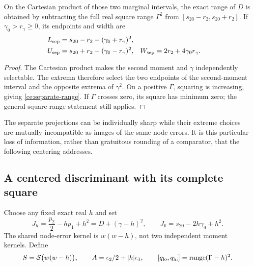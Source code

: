 \begin{proposition}
\label{ce:separate}
On the Cartesian product of those two marginal intervals, the exact
range of $D$ is obtained by subtracting the full real square range
$\Gamma^2$ from $[s_{20}-r_2,s_{20}+r_2]$.
If $\gamma_0>r_\gamma\ge0$, its endpoints and width are
\begin{align}
 L_{\rm sep}&=s_{20}-r_2-(\gamma_0+r_\gamma)^2,\notag\\
 U_{\rm sep}&=s_{20}+r_2-(\gamma_0-r_\gamma)^2,
 &W_{\rm sep}&=2r_2+4\gamma_0r_\gamma.
 \label{ce:separate-range}
\end{align}
\end{proposition}
\begin{proof}
The Cartesian product makes the second moment and $\gamma$ independently
selectable. The extrema therefore select the two endpoints of the
second-moment interval and the opposite extrema of $\gamma^2$.
On a positive $\Gamma$, squaring is increasing, giving
\eqref{ce:separate-range}. If $\Gamma$ crosses zero, its square has
minimum zero; the general square-range statement still applies.
\end{proof}

The separate projections can be individually sharp while their extreme
choices are mutually incompatible as images of the same node errors.
It is this particular loss of information, rather than gratuitous
rounding of a comparator, that the following centering addresses.

\subsection{A centered discriminant with its complete square}

Choose any fixed exact real $h$ and set
\begin{equation}
 J_h=\frac{p_2}{2}-hp_1+h^2=D+(\gamma-h)^2,
 \qquad
 J_0=s_{20}-2h\gamma_0+h^2.
 \label{ce:centered-identity}
\end{equation}
The shared node-error kernel is $w(w-h)$, not two independent
moment kernels. Define
\begin{equation}
 S=\mathcal S\bigl(w(w-h)\bigr),\qquad
 A=\epsilon_2/2+|h|\epsilon_1,
 \qquad [q_{\rm lo},q_{\rm hi}]=\operatorname{range}(\Gamma-h)^2.
 \label{ce:centered-budget}
\end{equation}

